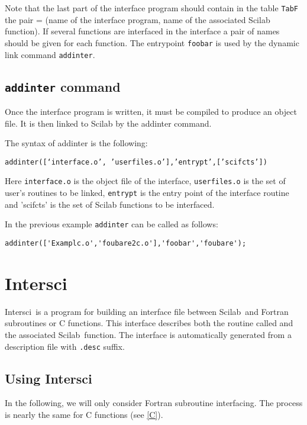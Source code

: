 Note that the last part of the interface program should contain in the
table {\tt  TabF} the pair = (name of the interface program, name of
the associated Scilab function). If several functions are 
interfaced in the interface a pair of names should be given for each function.
The entrypoint {\tt foobar}
is used by the dynamic link command {\tt addinter}.

\subsection{{\tt addinter} command}
Once the interface program is written, it must be compiled to produce 
an object file. It is then linked to Scilab by the addinter command.

The syntax of addinter is the following:

{\tt addinter([`interface.o', 'userfiles.o'],'entrypt',['scifcts'])}

Here {\tt interface.o} is the object file of the interface, 
{\tt userfiles.o} is the set of user's routines to be linked, 
{\tt entrypt} is the entry point of the interface routine and 
{'scifcts'} is the set of Scilab functions to be interfaced.

In the previous example {\tt addinter} can be called as follows:
\begin{verbatim}
addinter(['Examplc.o','foubare2c.o'],'foobar','foubare');
\end{verbatim}

\section{Intersci}

\newcommand{\ISCI}{Intersci}
\newcommand{\SCI}{Scilab}
\newcommand{\T}[1]{{\tt #1}}
\newcommand{\M}[1]{$<${\em #1}$>$}
\newcommand{\ie}{\mbox{i.e.}}

\ISCI\ is a program for building an interface file between \SCI\ and Fortran
subroutines or C functions. This interface describes both the routine
called and the associated \SCI\ function.  The interface is automatically 
generated from a description file with {\tt .desc} suffix.

\subsection{Using \ISCI}
In the following, we will only consider Fortran subroutine interfacing. The
process is nearly the same for C functions (see \ref{C}).

